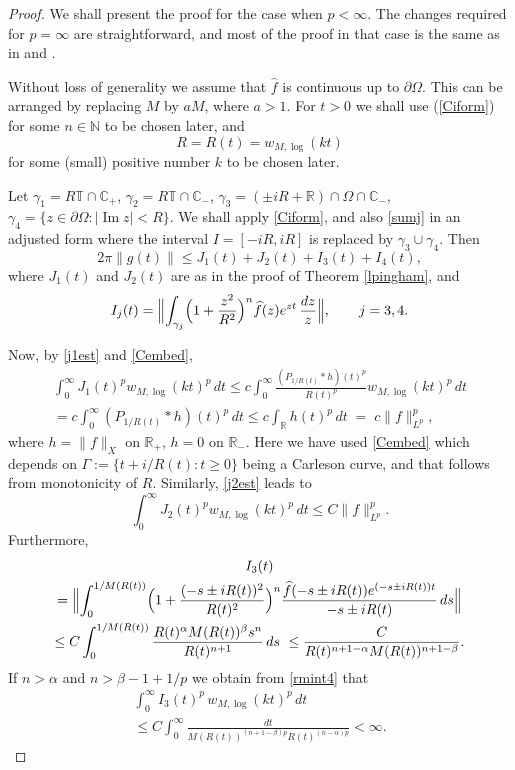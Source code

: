 \documentclass[11pt]{amsart}
\theoremstyle{definition}
\theoremstyle{remark}
\numberwithin{equation}{section}
\begin{document}
\begin{proof} We shall present the proof for the case when $p < \infty$. The changes required for $p=\infty$ are straightforward, and most of the proof in that case is the same as in \cite{BaDu} and \cite[Theorem 4.4.6]{ABHN01}.

Without loss of generality we assume that $\widehat f$ is continuous up to $\partial\Omega$.  This can be arranged by replacing $M$ by $aM$, where $a>1$.
For $t > 0$ we shall use  (\ref{Ciform}) for some $n\in{{\mathbb N}}$ to be chosen later,  and
$$
R=R(t)= {w_{M,{\log}}}(kt)
$$
for some (small) positive number $k$ to be chosen later.

Let $\gamma_1=R\mathbb T\cap \mathbb C_+$, $\gamma_2 =R\mathbb T \cap
\mathbb C_-$, $\gamma_3=(\pm iR+\mathbb R)\cap \Omega \cap \mathbb C_-$,  $\gamma_4= \{z \in \partial\Omega: |\operatorname{Im} z| < R\}$.  We shall apply \eqref{Ciform}, and also \eqref{sumj} in an adjusted form where 
the interval $I = [-iR,iR]$ is replaced by $\gamma_3 \cup \gamma_4$.  Then
$$
2\pi \|g(t)\| \le J_1(t)+J_2(t)+I_3(t)+I_4(t),
$$
where $J_1(t)$ and $J_2(t)$ are as in the proof of Theorem \ref{lpingham}, and
$$
I_j(t) = \Bigl\|\int_{\gamma_j} \Bigl(1+\frac
{z^2}{R^2}\Bigr)^n \widehat f(z)
e^{zt}\,\frac{dz}{z}\Bigr\|, \qquad j=3,4.
$$

Now, by \eqref{j1est} and \eqref{Cembed},
\begin{multline} \label{i1est}
\int_0^{\infty} J_1(t) ^p {w_{M,{\log}}}(kt)^p \,dt
 \le c \int_0^\infty \frac{(P_{1/R(t)}*h)(t)^p}{R(t)^p} {w_{M,{\log}}}(kt)^p \,dt
 \\
= c\int_0^\infty (P_{1/R(t)}*h)(t)^p \, dt
\le c\int_{{\mathbb R}} h(t)^p \, dt \; = \; c \|f\|_{L^p}^p,
\end{multline}
where
$h=\|f\|_X$ on $\mathbb R_+$, $h=0$ on $\mathbb R_-$.  Here we have used \eqref{Cembed} which depends on $\Gamma:= \{t+i/R(t): t \ge 0\}$ being a Carleson curve, and that follows from monotonicity of $R$.
Similarly, \eqref{j2est} leads to
\begin{equation} \label{i2est}
\int_0^{\infty} J_2(t)^p {w_{M,{\log}}}(kt)^p \,dt  \le  C \|f\|_{L^p}^p.
\end{equation}
Furthermore,
\begin{multline}  \label{i3est}
I_3(t) \\= \Bigl\| \int_{0}^{1/M(R(t))} \Bigl( 1 + \frac{(-s \pm iR(t))^2}{R(t)^2} \Bigr)^n \frac {\widehat f(-s\pm iR(t)) e^{(-s \pm iR(t))t}} {-s \pm iR(t)} \, ds \Bigr\|  \\
 \le C\int_{0}^{1/M(R(t))} \frac{R(t)^\alpha M(R(t))^{\beta} s^n}{R(t)^{n+1}} \,ds
  \le \frac{C}{R(t)^{n+1-\alpha}M(R(t))^{n+1-\beta}}.
\end{multline}
If $n>\alpha$ and $n> \beta - 1 + 1/p$ we obtain from \eqref{rmint4} that
\begin{multline} \label{i3est2}
\int_0^{\infty} I_3(t) ^p \,{w_{M,{\log}}}(kt)^p \, dt  \\ \le C \int_0^{\infty} \frac{dt}{M(R(t))^{(n+1-\beta)p} R(t)^{(n-\alpha)p}}   < \infty.
\end{multline}


\end{proof}
\end{document}
